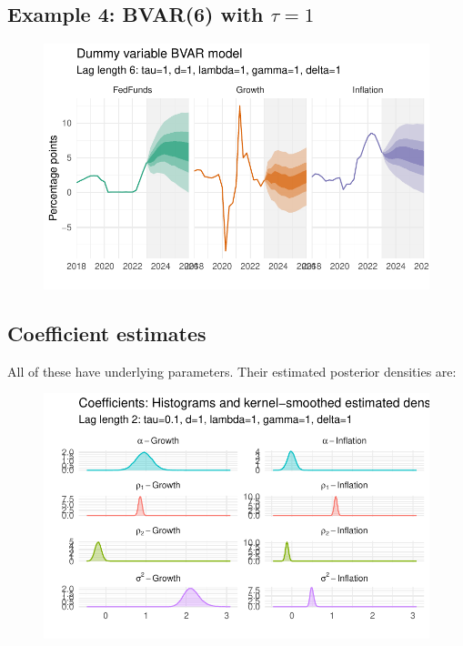\documentclass[
  letterpaper,
]{book}
\begin{document}
\hypertarget{example-4-bvar6-with-tau1}{%
\subsection{\texorpdfstring{Example 4: BVAR(6) with
\(\tau=1\)}{Example 4: BVAR(6) with \textbackslash tau=1}}\label{example-4-bvar6-with-tau1}}

\begin{figure}

{\centering \includegraphics{BVAR_files/figure-pdf/estim-1.pdf}

}

\end{figure}

\hypertarget{coefficient-estimates}{%
\subsection{Coefficient estimates}\label{coefficient-estimates}}

All of these have underlying parameters. Their estimated posterior
densities are:

\begin{figure}

{\centering \includegraphics{BVAR_files/figure-pdf/unnamed-chunk-9-1.pdf}

}

\end{figure}
\end{document}
